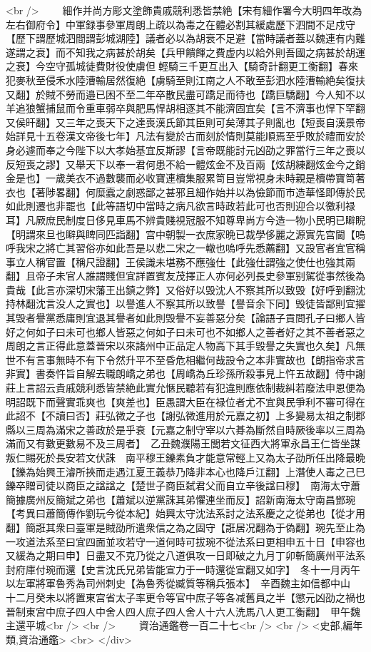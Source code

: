 <br />
　　細作并尚方彫文塗飾貴戚競利悉皆禁絶【宋有細作署今大明四年改為左右御府令】中軍録事參軍周朗上疏以為毒之在體必割其緩處歷下泗間不足戍守【歷下謂歷城泗間謂彭城湖陸】議者必以為胡衰不足避【當時議者蓋以魏連有内難遂謂之衰】而不知我之病甚於胡矣【兵甲饋餫之費虚内以給外則吾國之病甚於胡運之衰】今空守孤城徒費財役使虜但輕騎三千更互出入【騎奇計翻更工衡翻】春來犯麥秋至侵禾水陸漕輸居然復絶【虜騎至則江南之人不敢至彭泗水陸漕輸絶矣復扶又翻】於賊不勞而邉已困不至二年卒散民盡可蹻足而待也【蹻巨驕翻】今人知不以羊追狼蟹捕鼠而令重車弱卒與肥馬悍胡相逐其不能濟固宜矣【言不濟事也悍下罕翻又侯旰翻】又三年之喪天下之達喪漢氏節其臣則可矣薄其子則亂也【短喪自漢景帝始詳見十五卷漢文帝後七年】凡法有變於古而刻於情則莫能順焉至乎敗於禮而安於身必遽而奉之今陛下以大孝始基宜反斯謬【言帝既能討元凶劭之罪當行三年之喪以反短喪之謬】又舉天下以奉一君何患不給一體炫金不及百兩【炫胡練翻炫金今之銷金是也】一歲美衣不過數襲而必收寶連櫝集服累笥目豈常視身未時親是櫝帶寶笥著衣也【著陟畧翻】何糜蠧之劇惑鄙之甚邪且細作始并以為儉節而市造華怪即傳於民如此則遷也非罷也【此等語切中當時之病凡欲言時政若此可也否則迎合以徼利禄耳】凡厥庶民制度日侈見車馬不辨貴賤視冠服不知尊卑尚方今造一物小民明已䁹睨【明謂來旦也䁹與睥同匹詣翻】宫中朝製一衣庶家晩已裁學侈麗之源實先宫閫【嗚呼我宋之將亡其習俗亦如此吾是以悲二宋之一轍也嗚呼先悉薦翻】又設官者宜官稱事立人稱官置【稱尺證翻】王侯識未堪務不應強仕【此強仕謂強之使仕也強其兩翻】且帝子未官人誰謂賤但宜詳置賓友茂擇正人亦何必列長史參軍别駕從事然後為貴哉【此言亦深切宋藩王出鎮之弊】又俗好以毁沈人不察其所以致毁【好呼到翻沈持林翻沈言没人之實也】以譽進人不察其所以致譽【譽音余下同】毁徒皆鄙則宜擢其毁者譽黨悉庸則宜退其譽者如此則毁譽不妄善惡分矣【論語子貢問孔子曰鄉人皆好之何如子曰未可也鄉人皆惡之何如子曰未可也不如鄉人之善者好之其不善者惡之周朗之言正得此意蓋晉宋以來諸州中正品定人物高下其手毀譽之失實也久矣】凡無世不有言事無時不有下令然升平不至昏危相繼何哉設令之本非實故也【朗指帝求言非實】書奏忤旨自解去職朗嶠之弟也【周嶠為丘珍孫所殺事見上忤五故翻】侍中謝莊上言詔云貴戚競利悉皆禁絶此實允愜民聽若有犯違則應依制裁糾若廢法申恩便為明詔既下而聲實乖爽也【爽差也】臣愚謂大臣在禄位者尤不宜與民爭利不審可得在此詔不【不讀曰否】莊弘微之子也【謝弘微進用於元嘉之初】上多變易太祖之制郡縣以三周為滿宋之善政於是乎衰【元嘉之制守宰以六朞為斷然自時厥後率以三周為滿而又有數更數易不及三周者】　乙丑魏濮陽王閭若文征西大將軍永昌王仁皆坐謀叛仁賜死於長安若文伏誅　南平穆王鑠素負才能意常輕上又為太子劭所任出降最晩【鑠為始興王濬所挾而走遇江夏王義恭乃降非本心也降戶江翻】上潛使人毒之己巳鑠卒贈司徒以商臣之諡諡之【楚世子商臣弑君父而自立辛後諡曰穆】　南海太守蕭簡據廣州反簡斌之弟也【蕭斌以逆黨誅其弟懼連坐而反】詔新南海太守南昌鄧琬　【考異曰蕭簡傳作劉玩今從本紀】始興太守沈法系討之法系慶之之從弟也【從才用翻】簡誑其衆曰臺軍是賊劭所遣衆信之為之固守【誑居况翻為于偽翻】琬先至止為一攻道法系至曰宜四面並攻若守一道何時可拔琬不從法系曰更相申五十日【申容也又緩為之期曰申】日盡又不克乃從之八道俱攻一日即破之九月丁卯斬簡廣州平法系封府庫付琬而還【史言沈氏兄弟皆能宣力于一時還從宣翻又如字】　冬十一月丙午以左軍將軍魯秀為司州刺史【為魯秀從臧質等稱兵張本】　辛酉魏主如信都中山　十二月癸未以將置東宫省太子率更令等官中庶子等各减舊員之半【懲元凶劭之禍也晉制東宫中庶子四人中舍人四人庶子四人舍人十六人洗馬八人更工衡翻】　甲午魏主還平城<br />
<br />
　　資治通鑑卷一百二十七<br />
<br />
<史部,編年類,資治通鑑>  <br>
   </div> 

